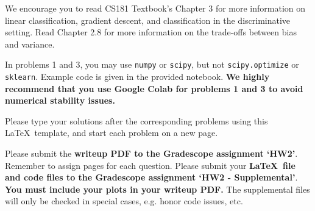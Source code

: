 \documentclass[submit]{../harvardml}
\begin{document}
We encourage you to read CS181 Textbook's Chapter 3 for more
information on linear classification, gradient descent, and
classification in the discriminative setting. Read Chapter 2.8 for
more information on the trade-offs between bias and variance.

In problems 1 and 3, you may use \texttt{numpy} or \texttt{scipy}, but
not \texttt{scipy.optimize} or \texttt{sklearn}. Example code is given
in the provided notebook. \textbf{We highly recommend that you use Google Colab for problems 1 and 3 to avoid numerical stability issues.}

Please type your solutions after the corresponding problems using this
\LaTeX\ template, and start each problem on a new page.

Please submit the \textbf{writeup PDF to the Gradescope assignment
  `HW2'}. Remember to assign pages for each question.  Please submit
your \textbf{\LaTeX\ file and code files to the Gradescope assignment
  `HW2 - Supplemental'}. \textbf{You must include your plots in your
  writeup PDF. } The supplemental files will only be checked in
special cases, e.g. honor code issues, etc.

\end{document}
